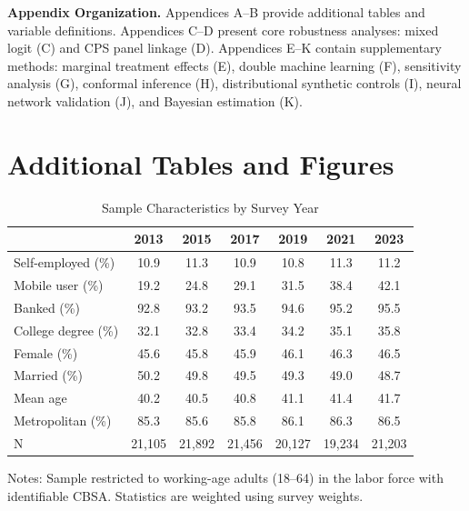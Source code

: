 \documentclass[12pt]{article}
\begin{document}

\newpage
\appendix
\doublespacing

\textbf{Appendix Organization.} Appendices A--B provide additional tables and variable definitions. Appendices C--D present core robustness analyses: mixed logit (C) and CPS panel linkage (D). Appendices E--K contain supplementary methods: marginal treatment effects (E), double machine learning (F), sensitivity analysis (G), conformal inference (H), distributional synthetic controls (I), neural network validation (J), and Bayesian estimation (K).

\section{Additional Tables and Figures}

\begin{table}[H]
\centering
\caption{Sample Characteristics by Survey Year}
\label{tab:sample_characteristics}
\begin{threeparttable}
\begin{tabular}{lcccccc}
\toprule
& 2013 & 2015 & 2017 & 2019 & 2021 & 2023 \\
\midrule
Self-employed (\%) & 10.9 & 11.3 & 10.9 & 10.8 & 11.3 & 11.2 \\
Mobile user (\%) & 19.2 & 24.8 & 29.1 & 31.5 & 38.4 & 42.1 \\
Banked (\%) & 92.8 & 93.2 & 93.5 & 94.6 & 95.2 & 95.5 \\
College degree (\%) & 32.1 & 32.8 & 33.4 & 34.2 & 35.1 & 35.8 \\
Female (\%) & 45.6 & 45.8 & 45.9 & 46.1 & 46.3 & 46.5 \\
Married (\%) & 50.2 & 49.8 & 49.5 & 49.3 & 49.0 & 48.7 \\
Mean age & 40.2 & 40.5 & 40.8 & 41.1 & 41.4 & 41.7 \\
Metropolitan (\%) & 85.3 & 85.6 & 85.8 & 86.1 & 86.3 & 86.5 \\
\midrule
N & 21,105 & 21,892 & 21,456 & 20,127 & 19,234 & 21,203 \\
\bottomrule
\end{tabular}
\begin{tablenotes}
\small
\item Notes: Sample restricted to working-age adults (18--64) in the labor force with identifiable CBSA. Statistics are weighted using survey weights.
\end{tablenotes}
\end{threeparttable}
\end{table}
\end{document}
